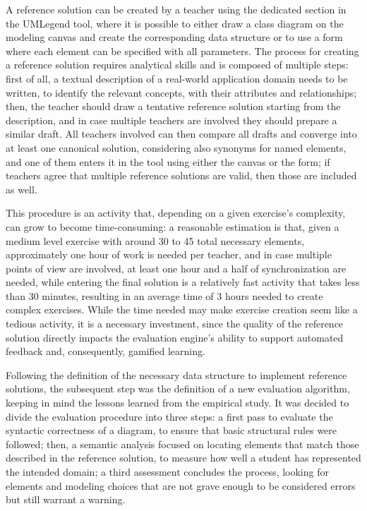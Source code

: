 A reference solution can be created by a teacher using the dedicated section in the UMLegend tool, where it is possible to either draw a class diagram on the modeling canvas and create the corresponding data structure or to use a form where each element can be specified with all parameters. The process for creating a reference solution requires analytical skills and is composed of multiple steps: first of all, a textual description of a real-world application domain needs to be written, to identify the relevant concepts, with their attributes and relationships; then, the teacher should draw a tentative reference solution starting from the description, and in case multiple teachers are involved they should prepare a similar draft. All teachers involved can then compare all drafts and converge into at least one canonical solution, considering also synonyms for named elements, and one of them enters it in the tool using either the canvas or the form; if teachers agree that multiple reference solutions are valid, then those are included as well.

This procedure is an activity that, depending on a given exercise's complexity, can grow to become time-consuming: a reasonable estimation is that, given a medium level exercise with around 30 to 45 total necessary elements, approximately one hour of work is needed per teacher, and in case multiple points of view are involved, at least one hour and a half of synchronization are needed, while entering the final solution is a relatively fast activity that takes less than 30 minutes, resulting in an average time of 3 hours needed to create complex exercises. While the time needed may make exercise creation seem like a tedious activity, it is a necessary investment, since the quality of the reference solution directly impacts the evaluation engine's ability to support automated feedback and, consequently, gamified learning.

Following the definition of the necessary data structure to implement reference solutions, the subsequent step was the definition of a new evaluation algorithm, keeping in mind the lessons learned from the empirical study. It was decided to divide the evaluation procedure into three steps: a first pass to evaluate the syntactic correctness of a diagram, to ensure that basic structural rules were followed; then, a semantic analysis focused on locating elements that match those described in the reference solution, to measure how well a student has represented the intended domain; a third assessment concludes the process, looking for elements and modeling choices that are not grave enough to be considered errors but still warrant a warning. 

